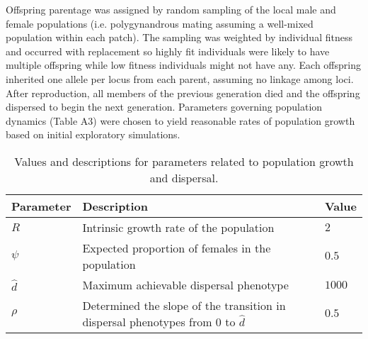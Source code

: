 \documentclass[11pt]{article}
\begin{document}
Offspring parentage was assigned by random sampling of the local male and female populations (i.e. polygynandrous mating assuming a well-mixed population within each patch). The sampling was weighted by individual fitness and occurred with replacement so highly fit individuals were likely to have multiple offspring while low fitness individuals might not have any. Each offspring inherited one allele per locus from each parent, assuming no linkage among loci. After reproduction, all members of the previous generation died and the offspring dispersed to begin the next generation. Parameters governing population dynamics (Table A3) were chosen to yield reasonable rates of population growth based on initial exploratory simulations.

\begin{table}
\renewcommand{\arraystretch}{1.5}
  \begin{tabular}{ p{2cm} | p{8cm} | p{2cm} }
    \hline
    Parameter & Description & Value \\ \hline \hline
    $R$ & Intrinsic growth rate of the population & $2$ \\
    $\psi$ & Expected proportion of females in the population & $0.5$ \\
    $\hat{d}$ & Maximum achievable dispersal phenotype & $1000$ \\
    $\rho$ & Determined the slope of the transition in dispersal phenotypes from $0$ to $\hat{d}$ & $0.5$ \\
    \hline
  \end{tabular}
\caption[LoF entry]{Values and descriptions for parameters related to population growth and dispersal.}
\label{table:PopPars}
\end{table}
\end{document}
